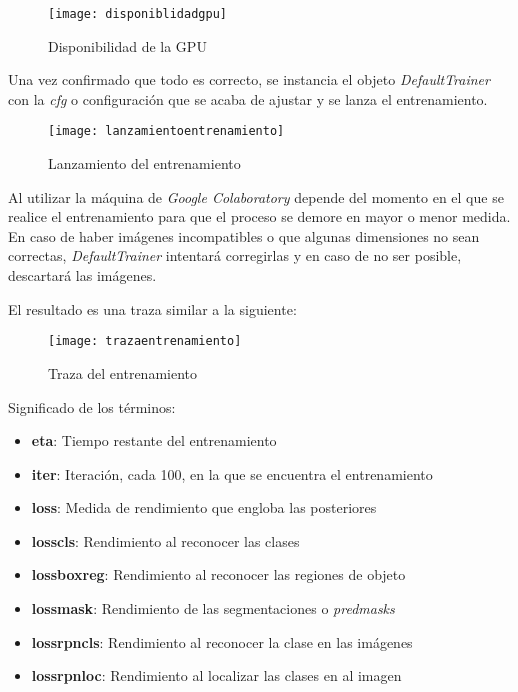 \begin{figure}[htb]
\centering
\texttt{[image: disponiblidadgpu]}
\caption[Disponibilidad de la GPU]{Disponibilidad de la GPU}
\end{figure}

Una vez confirmado que todo es correcto, se instancia el objeto \emph{DefaultTrainer} con la \emph{cfg} o configuración que se acaba de ajustar y se lanza el entrenamiento.

\begin{figure}[htb]
\centering
\texttt{[image: lanzamientoentrenamiento]}
\caption[Lanzamiento del entrenamiento]{Lanzamiento del entrenamiento}
\end{figure}

\clearpage

Al utilizar la máquina de \emph{Google Colaboratory} depende del momento en el que se realice el entrenamiento para que el proceso se demore en mayor o menor medida. En caso de haber imágenes incompatibles o que algunas dimensiones no sean correctas, \emph{DefaultTrainer} intentará corregirlas y en caso de no ser posible, descartará las imágenes.

El resultado es una traza similar a la siguiente:

\begin{figure}[htb]
\texttt{[image: trazaentrenamiento]}
\caption[Traza del entrenamiento]{Traza del entrenamiento}
\end{figure}

Significado de los términos:

\begin{itemize}
        \item \textbf{eta}: Tiempo restante del entrenamiento
        \item \textbf{iter}: Iteración, cada 100, en la que se encuentra el entrenamiento
        \item \textbf{loss}: Medida de rendimiento que engloba las posteriores
        \item \textbf{loss\textunderscore cls}: Rendimiento al reconocer las clases
        \item \textbf{loss\textunderscore box\textunderscore reg}: Rendimiento al reconocer las regiones de objeto
        \item \textbf{loss\textunderscore mask}: Rendimiento de las segmentaciones o \emph{pred\textunderscore masks}
        \item \textbf{loss\textunderscore rpn\textunderscore cls}: Rendimiento al reconocer la clase en las imágenes
        \item \textbf{loss\textunderscore rpn\textunderscore loc}: Rendimiento al localizar las clases en al imagen
\end{itemize}

